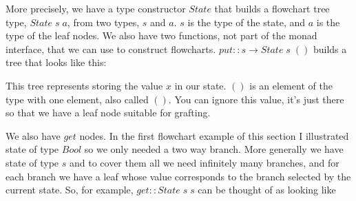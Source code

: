 \documentclass{article}
\newcommand{\Conid}[1]{\mathit{#1}}
\newcommand{\Varid}[1]{\mathit{#1}}
\begin{document}
More precisely, we have a type constructor \ensuremath{\Conid{State}} that builds a flowchart tree type, \ensuremath{\Conid{State}\;\Varid{s}\;\Varid{a}}, from two types, \ensuremath{\Varid{s}} and \ensuremath{\Varid{a}}. \ensuremath{\Varid{s}} is the type of the state, and \ensuremath{\Varid{a}} is the type of the leaf nodes. We also have two functions, not part of the monad interface, that we can use to construct flowcharts. \ensuremath{\Varid{put}\mathbin{::}\Varid{s}\to \Conid{State}\;\Varid{s}\;()} builds a tree that looks like this:

\begin{center}
\end{center}

This tree represents storing the value \ensuremath{\Varid{x}} in our state. \ensuremath{()} is an element of the type with one element, also called \ensuremath{()}. You can ignore this value, it's just there so that we have a leaf node suitable for grafting.

We also have \ensuremath{\Varid{get}} nodes. In the first flowchart example of this section I illustrated state of type \ensuremath{\Conid{Bool}} so we only needed a two way branch. More generally we have state of type \ensuremath{\Varid{s}} and to cover them all we need infinitely many branches, and for each branch we have a leaf whose value corresponds to the branch selected by the current state. So, for example, \ensuremath{\Varid{get}\mathbin{::}\Conid{State}\;\Varid{s}\;\Varid{s}} can be thought of as looking like

\begin{center}
\end{center}
\end{document}
